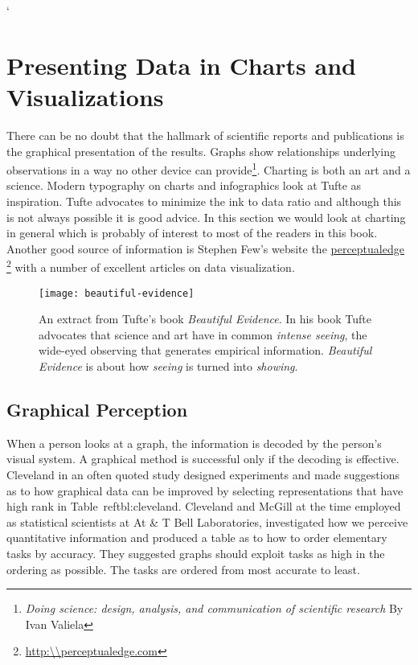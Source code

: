 `\chapter{Presenting Data in Charts and Visualizations}
\pagestyle{headings}

There can be no doubt that the hallmark of scientific reports and publications is the graphical presentation of the results. Graphs show relationships underlying observations in a way no other device can provide\footnote{\textit{Doing science: design, analysis, and communication of scientific research}
 By Ivan Valiela}.  Charting is both an art and a science. Modern typography on charts and infographics look at Tufte as inspiration.
Tufte advocates to minimize the ink to data ratio and although this is not always possible it is good advice.
In this section we would look at charting in general which is probably of interest to most of the readers
in this book.  Another good source of information is Stephen Few’s website the \href{perpetualedge}{perceptualedge} \footnote{\protect\url{http:\\perceptualedge.com}}  with a number of excellent articles on data visualization. 

\begin{figure}[htbp]
\texttt{[image: beautiful-evidence]}
\caption{An extract from Tufte’s book \textit{Beautiful Evidence}. In his book Tufte advocates that science and art have in common \emph{intense seeing}, the wide-eyed observing that generates empirical information. \textit{Beautiful Evidence} is about how \emph{seeing} is turned into \emph{showing}. \cite{Tufte2006}}
\end{figure}

\section{Graphical Perception}

When a person looks at a graph, the information is decoded by the person’s visual system. A graphical method is successful only if the decoding is effective. Cleveland \citeyearpar{cleveland1985} in an often quoted study designed experiments and made suggestions as to how graphical data can be improved by selecting representations that have high rank in Table~ref{tbl:cleveland}. Cleveland and McGill at the time employed as statistical scientists at At \& T Bell Laboratories, investigated how we perceive quantitative information and produced a table as to how to order elementary tasks by accuracy. They suggested graphs should exploit tasks as high in the ordering as possible. The tasks are ordered from most accurate to least.

